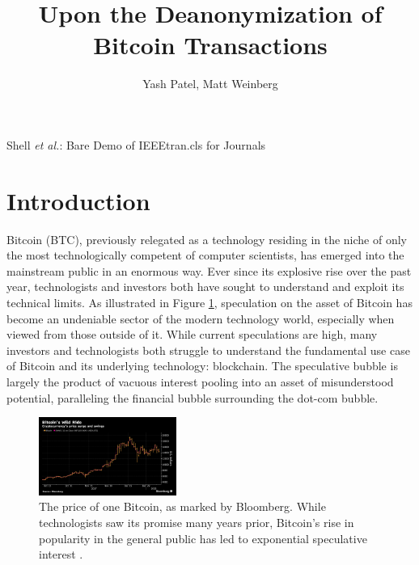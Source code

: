 \documentclass[journal]{IEEEtran}
\begin{document}
\title{Upon the Deanonymization of Bitcoin Transactions}
\author{Yash Patel, Matt Weinberg}

%
{Shell \MakeLowercase{\textit{et al.}}: Bare Demo of IEEEtran.cls for Journals}
\maketitle

\begin{abstract}
\end{abstract}

\section{Introduction}
Bitcoin (BTC), previously relegated as a technology residing in the niche of only the most technologically competent of computer scientists, has emerged into the mainstream public in an enormous way. Ever since its explosive rise over the past year, technologists and investors both have sought to understand and exploit its technical limits. As illustrated in Figure \ref{fig:BTC_price}, speculation on the asset of Bitcoin has become an undeniable sector of the modern technology world, especially when viewed from those outside of it. While current speculations are high, many investors and technologists both struggle to understand the fundamental use case of Bitcoin and its underlying technology: blockchain. The speculative bubble is largely the product of vacuous interest pooling into an asset of misunderstood potential, paralleling the financial bubble surrounding the dot-com bubble. 

\begin{figure}
    \label{fig:BTC_price}
    \centering
    \includegraphics[width=0.4\textwidth]{BTC_price.png}
    \caption{The price of one Bitcoin, as marked by Bloomberg. While technologists saw its promise many years prior, Bitcoin's rise in popularity in the general public has led to exponential speculative interest \cite{goldman}.}
\end{figure}
\end{document}
